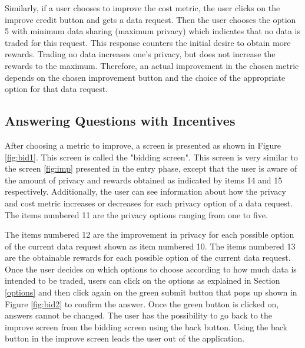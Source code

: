 Similarly, if a user chooses to improve the cost metric, the user clicks on the improve credit button and gets a data request. Then the user chooses the option 5 with minimum data sharing (maximum privacy) which indicates that no data is traded for this request. This response counters the initial desire to obtain more rewards. Trading no data increases one's privacy, but does not increase the rewards to the maximum. Therefore, an actual improvement in the chosen metric depends on the chosen improvement button and the choice of the appropriate option for that data request.

\subsection{Answering Questions with Incentives}

After choosing a metric to improve, a screen is presented as shown in Figure \ref{fig:bid1}.
This screen is called the "bidding screen". This screen is very similar to the screen \ref{fig:imp} presented in the entry phase, except that the user
is aware of the amount of privacy and rewards obtained as indicated by items 14 and 15 respectively. Additionally, the user can see information about how the privacy and cost metric increases or decreases for each privacy option of a data request. The items numbered 11 are the privacy options ranging from one to five.

The items numbered 12 are the improvement in privacy for each possible option of the current data request shown as item numbered 10. The items numbered 13 are the obtainable rewards for each possible option of the current data request. Once the user decides on which options to choose according to how much data is intended to be traded, users can click on the options as explained in Section \ref{options} and then click again on the green submit button that pops up shown in Figure \ref{fig:bid2} to confirm the answer. Once the green button is clicked on, answers cannot be changed. The user has the possibility to go back to the improve screen from the bidding screen using the back button. Using the back button in the improve screen leads the user out of the application.

